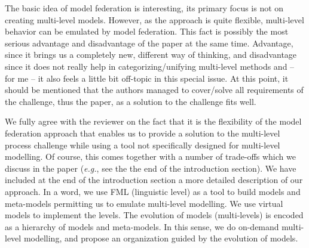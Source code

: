 \documentclass[10pt]{article}
\begin{document}
\begin{response}{The basic idea of model federation is interesting, its primary focus is not on creating multi-level models. However, as the approach is quite flexible, multi-level behavior can be emulated by model federation. This fact is possibly the most serious advantage and disadvantage of the paper at the same time. Advantage, since it brings us a completely new, different way of thinking, and disadvantage since it does not really help in categorizing/unifying multi-level methods and -- for me -- it also feels a little bit off-topic in this special issue. At this point, it should be mentioned that the authors managed to cover/solve all requirements of the challenge, thus the paper, as a solution to the challenge fits well.}

We fully agree with the reviewer on the fact that it is the flexibility of the model federation approach that enables us to provide a solution to the multi-level process challenge while using a tool not specifically designed for multi-level modelling. Of course, this comes together with a number of trade-offs which we discuss in the paper (\emph{e.g.}, see the the end of the introduction section).%
We have included at the end of the introduction section a more detailed description of our approach. In a word, we use FML (linguistic level) as a tool to build models and meta-models permitting us to emulate multi-level modelling. We use virtual models to implement the levels. The evolution of models (multi-levels) is encoded as a hierarchy of models and meta-models. In this sense, we do on-demand multi-level modelling, and propose an organization guided by the evolution of models.%



\end{response}
\end{document}
